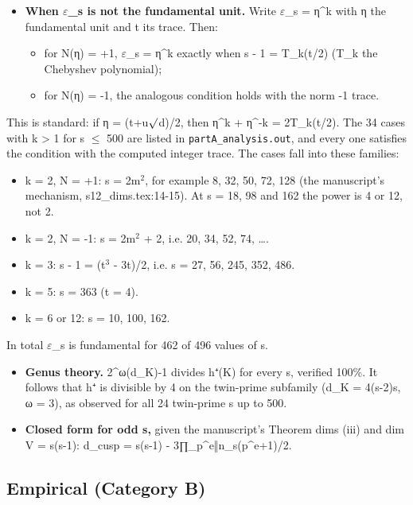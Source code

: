 \documentclass[10pt]{article}\usepackage[margin=0.8in]{geometry}\usepackage{amssymb,longtable,array,url,hyperref}\usepackage[T1]{fontenc}\usepackage{lmodern}\sloppy\usepackage{newunicodechar}\newunicodechar{η}{\ensuremath{\eta}}\newunicodechar{ω}{\ensuremath{\omega}}\newunicodechar{⁺}{\ensuremath{^{+}}}\newunicodechar{⁻}{\ensuremath{^{-}}}\newunicodechar{∏}{\ensuremath{\prod}}\newunicodechar{⁸}{\ensuremath{^{8}}}\newunicodechar{⁴}{\ensuremath{^{4}}}\newunicodechar{⁶}{\ensuremath{^{6}}}\newunicodechar{θ}{\ensuremath{\theta}}\newunicodechar{₇}{\ensuremath{_{7}}}\newunicodechar{₂}{\ensuremath{_{2}}}\newunicodechar{₁}{\ensuremath{_{1}}}\newunicodechar{⊕}{\ensuremath{\oplus}}
\begin{document}
\begin{itemize}
\item  \textbf{When $\varepsilon$\_s is not the fundamental unit.} Write $\varepsilon$\_s = η\^{}k with η the fundamental unit and t its trace. Then:
\begin{itemize}
\item  for N(η) = +1, $\varepsilon$\_s = η\^{}k exactly when s - 1 = T\_k(t/2) (T\_k the Chebyshev polynomial);
\item  for N(η) = -1, the analogous condition holds with the norm -1 trace.
\end{itemize}
\end{itemize}

   This is standard: if η = (t+u$\surd$d)/2, then η\^{}k + η\^{}{-k} = 2T\_k(t/2). The 34 cases with k > 1 for s $\leq$ 500 are listed in \texttt{partA\_analysis.out}, and every one satisfies the condition with the computed integer trace. The cases fall into these families:
\begin{itemize}
\begin{itemize}
\item  k = 2, N = +1: s = 2m$^2$, for example 8, 32, 50, 72, 128 (the manuscript's mechanism, s12\_dims.tex:14-15). At s = 18, 98 and 162 the power is 4 or 12, not 2.
\item  k = 2, N = -1: s = 2m$^2$ + 2, i.e. 20, 34, 52, 74, \ldots{}.
\item  k = 3: s - 1 = (t$^3$ - 3t)/2, i.e. s = 27, 56, 245, 352, 486.
\item  k = 5: s = 363 (t = 4).
\item  k = 6 or 12: s = 10, 100, 162.
\end{itemize}
\end{itemize}

   In total $\varepsilon$\_s is fundamental for 462 of 496 values of s.
\begin{itemize}
\item  \textbf{Genus theory.} 2\^{}{ω(d\_K)-1} divides h⁺(K) for every s, verified 100\%. It follows that h⁺ is divisible by 4 on the twin-prime subfamily (d\_K = 4(s-2)s, ω = 3), as observed for all 24 twin-prime s up to 500.
\item  \textbf{Closed form for odd s,} given the manuscript's Theorem dims (iii) and dim V = s(s-1): d\_cusp = s(s-1) - 3∏\_{p\^{}e‖n\_s}(p\^{}e+1)/2.
\end{itemize}

\subsection*{Empirical (Category B)}
\end{document}
